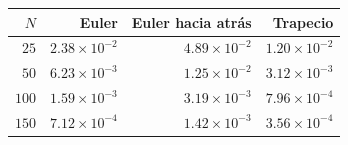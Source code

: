 \begin{tabular}{r r r r}
\toprule
\rowcolor{Azul1!50}
$N$ & Euler & Euler hacia atrás & Trapecio \\
\midrule
$25$ & $2.38\times10^{-2}$ & $4.89\times10^{-2}$ & $1.20\times10^{-2}$ \\
$50$ & $6.23\times10^{-3}$ & $1.25\times10^{-2}$ & $3.12\times10^{-3}$ \\
$100$ & $1.59\times10^{-3}$ & $3.19\times10^{-3}$ & $7.96\times10^{-4}$ \\
$150$ & $7.12\times10^{-4}$ & $1.42\times10^{-3}$ & $3.56\times10^{-4}$ \\
\bottomrule
\end{tabular}
